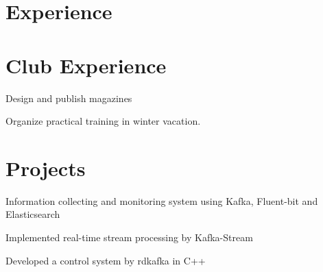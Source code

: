 \documentclass[]{deedy-resume-openfont}
\begin{document}
\begin{minipage}[t]{0.73\textwidth} 


\section{Experience}
\sectionsep


\sectionsep

\section{Club Experience}
\sectionsep

\begin{tightemize}
    \item
    \item Design and publish magazines
\end{tightemize}

\sectionsep

\begin{tightemize}
    \item Organize practical training in winter vacation.
\end{tightemize}

\sectionsep


\section{Projects}
\sectionsep

\begin{tightemize}
    \item Information collecting and monitoring system using Kafka, Fluent-bit and Elasticsearch
    \item Implemented real-time stream processing by Kafka-Stream
    \item Developed a control system by rdkafka in C++
\end{tightemize}
\sectionsep


\end{minipage}
\end{document}
